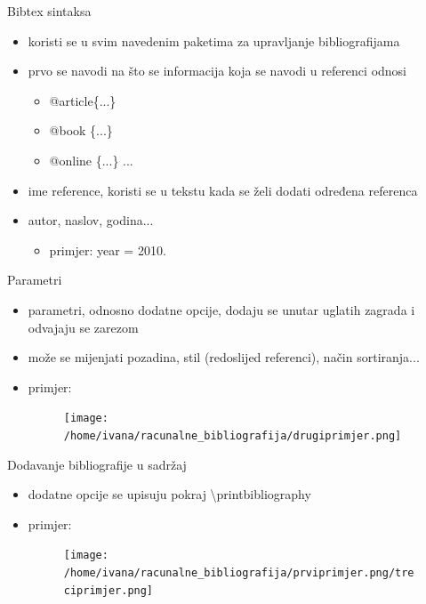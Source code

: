 \documentclass{beamer}
\begin{document}
\begin{frame}{Bibtex sintaksa}
\begin{itemize}
	\item koristi se u svim navedenim paketima za upravljanje bibliografijama \\
	\item prvo se navodi na što se informacija koja se navodi u referenci odnosi \\
	\begin{itemize}
		\item @article\{...\} \\
		\item @book \{...\}\\
		\item @online \{...\} ... \\
	\end{itemize}
	\item ime reference, koristi se u tekstu kada se želi dodati određena referenca \\
	\item autor, naslov, godina... 
		\begin{itemize}
			\item primjer: year = 2010.
		\end{itemize}
\end{itemize}
\end{frame}

\begin{frame}{Parametri}
\begin{itemize}
	\item parametri, odnosno dodatne opcije, dodaju se unutar uglatih zagrada i odvajaju se zarezom \\
	\item može se mijenjati pozadina, stil (redoslijed referenci), način sortiranja... \\
	\item primjer:
	\begin{figure}
		\texttt{[image: /home/ivana/racunalne\_bibliografija/drugiprimjer.png]}
	\end{figure}
\end{itemize}
\end{frame}

\begin{frame}{Dodavanje bibliografije u sadržaj}
\begin{itemize}
	\item dodatne opcije se upisuju pokraj \textbackslash printbibliography \\
	\item primjer:
	\begin{figure}
	\texttt{[image: /home/ivana/racunalne\_bibliografija/prviprimjer.png/treciprimjer.png]}
	\end{figure}
\end{itemize}
\end{frame}
\end{document}

